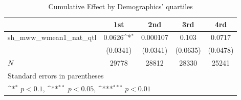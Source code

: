 \begin{table}[htbp]\centering
\def\sym#1{\ifmmode^{#1}\else\(^{#1}\)\fi}
\caption{Cumulative Effect by Demographics' quartiles}
\begin{tabular}{l*{4}{c}}
\hline\hline
            &\multicolumn{1}{c}{1st}&\multicolumn{1}{c}{2nd}&\multicolumn{1}{c}{3rd}&\multicolumn{1}{c}{4rd}\\
\hline
sh\_mww\_wmean1\_nat\_qtl&      0.0626\sym{*}  &    0.000107         &       0.103         &      0.0717         \\
            &    (0.0341)         &    (0.0341)         &    (0.0635)         &    (0.0478)         \\
\hline
\(N\)       &       29778         &       28812         &       28330         &       25241         \\
\hline\hline
\multicolumn{5}{l}{\footnotesize Standard errors in parentheses}\\
\multicolumn{5}{l}{\footnotesize \sym{*} \(p<0.1\), \sym{**} \(p<0.05\), \sym{***} \(p<0.01\)}\\
\end{tabular}
\end{table}
